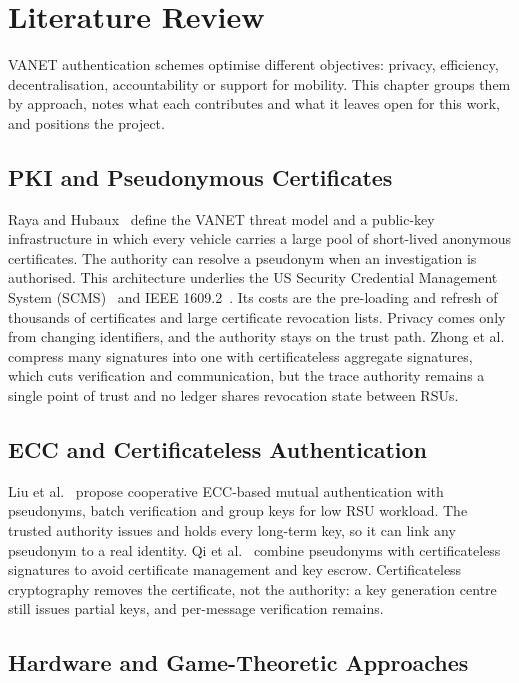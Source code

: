 \chapter{Literature Review}\label{ch:lit}

VANET authentication schemes optimise different objectives: privacy, efficiency, decentralisation,
accountability or support for mobility. This chapter groups them by approach, notes what each
contributes and what it leaves open for this work, and positions the project.

\section{PKI and Pseudonymous Certificates}

Raya and Hubaux~\cite{raya2007securing} define the VANET threat model and a public-key
infrastructure in which every vehicle carries a large pool of short-lived anonymous certificates.
The authority can resolve a pseudonym when an investigation is authorised. This architecture underlies
the US Security Credential Management System (SCMS)~\cite{brecht2018scms} and IEEE
1609.2~\cite{ieee16092}. Its costs are the pre-loading and refresh of thousands of certificates and
large certificate revocation lists. Privacy comes only from changing identifiers, and the authority
stays on the trust path. Zhong et al.~\cite{zhong2019aggregation} compress many signatures into one
with certificateless aggregate signatures, which cuts verification and communication, but the trace
authority remains a single point of trust and no ledger shares revocation state between RSUs.

\section{ECC and Certificateless Authentication}

Liu et al.~\cite{liu2025ecc} propose cooperative ECC-based mutual authentication with pseudonyms,
batch verification and group keys for low RSU workload. The trusted authority issues and holds every
long-term key, so it can link any pseudonym to a real identity. Qi et al.~\cite{qi2022certificateless}
combine pseudonyms with certificateless signatures to avoid certificate management and key escrow.
Certificateless cryptography removes the certificate, not the authority: a key generation centre
still issues partial keys, and per-message verification remains.

\section{Hardware and Game-Theoretic Approaches}

